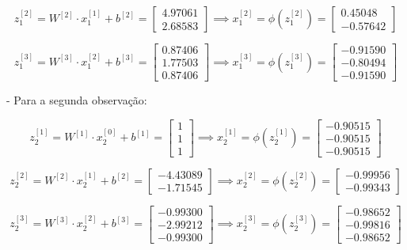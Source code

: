 \documentclass[a4paper,12pt]{article} %
\begin{document}
\begin{enumerate}
\begin{equation*}
    z^{[2]}_1 = W^{[2]} \cdot x^{[1]}_1 + b^{[2]} = \begin{bmatrix} 4.97061 \\ 2.68583 \end{bmatrix} \implies x^{[2]}_1 = \phi(z^{[2]}_1)= \begin{bmatrix} 0.45048 \\ -0.57642 \end{bmatrix}
\end{equation*}

\begin{equation*}
    z^{[3]}_1 = W^{[3]} \cdot x^{[2]}_1 + b^{[3]} = \begin{bmatrix} 0.87406 \\ 1.77503 \\ 0.87406 \end{bmatrix} \implies x^{[3]}_1 = \phi(z^{[3]}_1)= \begin{bmatrix} -0.91590 \\ -0.80494\\ -0.91590 \end{bmatrix}
\end{equation*}

- Para a segunda observação:

\begin{equation*}
    z^{[1]}_2 = W^{[1]} \cdot x^{[0]}_2 + b^{[1]} = \begin{bmatrix} 1 \\ 1 \\ 1 \end{bmatrix} \implies x^{[1]}_2 = \phi(z^{[1]}_2)= \begin{bmatrix} -0.90515 \\ -0.90515 \\ -0.90515 \end{bmatrix}
\end{equation*}

\begin{equation*}
    z^{[2]}_2 = W^{[2]} \cdot x^{[1]}_2 + b^{[2]} = \begin{bmatrix} -4.43089 \\ -1.71545 \end{bmatrix} \implies x^{[2]}_2 = \phi(z^{[2]}_2)= \begin{bmatrix} -0.99956 \\ -0.99343 \end{bmatrix}
\end{equation*}

\begin{equation*}
    z^{[3]}_2 = W^{[3]} \cdot x^{[2]}_2 + b^{[3]} = \begin{bmatrix} -0.99300 \\ -2.99212 \\ -0.99300 \end{bmatrix} \implies x^{[3]}_2 = \phi(z^{[3]}_2)= \begin{bmatrix} -0.98652 \\ -0.99816\\ -0.98652 \end{bmatrix}
\end{equation*}


\end{enumerate}
\end{document}
